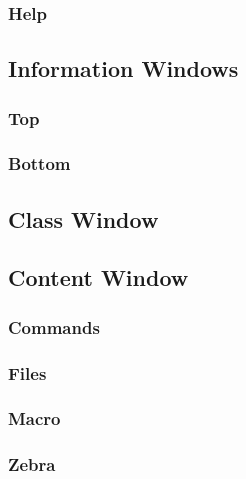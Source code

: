 \subsubsection{Help}

\subsection{Information Windows}

\subsubsection{Top}


\subsubsection{Bottom}


\subsection{Class Window}

\subsection{Content Window}

\subsubsection{Commands}


\subsubsection{Files}


\subsubsection{Macro}


\subsubsection{Zebra}


